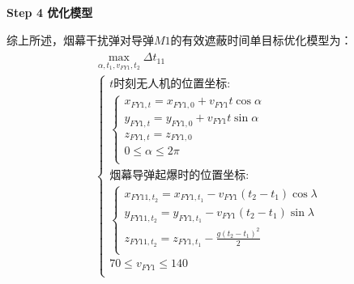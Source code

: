 \documentclass[../main.tex]{subfiles}
\begin{document}
\noindent \textbf{Step 4 优化模型}
\par 综上所述，烟幕干扰弹对导弹$M1$的有效遮蔽时间单目标优化模型为：
\begin{align}
  \begin{array}{c}
	\underset{\alpha ,t_1,v_{FY1},t_2}{\max}\Delta t_{11}
  \\
\left\{ \begin{array}{l}
	t\text{时刻无人机的位置坐标:}\\
	\left\{ \begin{array}{l}
	x_{FY1,t}=x_{FY1,0}+v_{FY1}t\cos \alpha \\
	y_{FY1,t}=y_{FY1,0}+v_{FY1}t\sin \alpha \\
	z_{FY1,t}=z_{FY1,0}\\
	0\leq \alpha \leq 2\pi \\
\end{array} \right.\\
	\text{烟幕导弹起爆时的位置坐标:}\\
	\left\{ \begin{array}{l}
	x_{FY11,t_2}=x_{FY1,t_1}-v_{FY1}\left( t_2-t_1 \right) \cos \lambda\\
	y_{FY11,t_2}=y_{FY1,t_1}-v_{FY1}\left( t_2-t_1 \right) \sin \lambda\\
	z_{FY11,t_2}=z_{FY1,t_1}-\frac{g\left( t_2-t_1 \right) ^2}{2}\\
\end{array} \right.\\
  70 \leq v_{FY1} \leq 140\\
\end{array} \right.  
\end{array}
\end{align}










  
\end{document}
